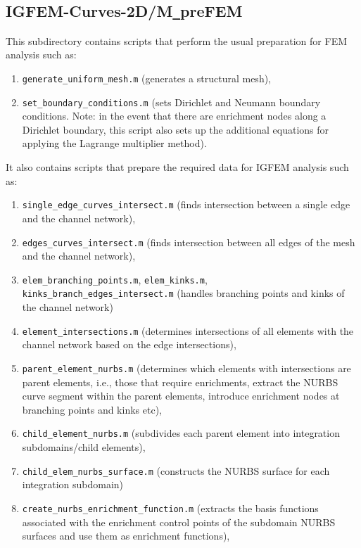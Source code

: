 \documentclass[11pt,letterpaper]{article}
\begin{document}
\subsection{IGFEM-Curves-2D/M\texttt{\_}preFEM}
This subdirectory contains scripts that perform the usual preparation for FEM analysis such as:
\begin{enumerate}
\item \texttt{generate\_uniform\_mesh.m} (generates a structural mesh),
\item \texttt{set\_boundary\_conditions.m} (sets Dirichlet and Neumann boundary conditions. Note: in the event that there are enrichment nodes along a Dirichlet boundary, this script also sets up the additional equations for applying the Lagrange multiplier method).  
\end{enumerate}

It also contains scripts that prepare the required data for IGFEM analysis such as:
\begin{enumerate}
\item \texttt{single\_edge\_curves\_intersect.m} (finds intersection between a single edge and the channel network),
\item \texttt{edges\_curves\_intersect.m}  (finds intersection between all edges of the mesh and the channel network),
\item \texttt{elem\_branching\_points.m}, \texttt{elem\_kinks.m}, \texttt{kinks\_branch\_edges\_intersect.m} (handles branching points and kinks of the channel network) 
\item \texttt{element\_intersections.m} (determines intersections of all elements with the channel network based on the edge intersections),
\item \texttt{parent\_element\_nurbs.m} (determines which elements with intersections are parent elements, i.e., those that require enrichments, extract the NURBS curve segment within the parent elements, introduce enrichment nodes at branching points and kinks etc),
\item \texttt{child\_element\_nurbs.m} (subdivides each parent element into integration subdomains/child elements),
\item \texttt{child\_elem\_nurbs\_surface.m} (constructs the NURBS surface for each integration subdomain)
\item \texttt{create\_nurbs\_enrichment\_function.m}  (extracts the basis functions associated with the enrichment control points of the subdomain NURBS surfaces and use them as enrichment functions),
\end{enumerate}
\end{document}
